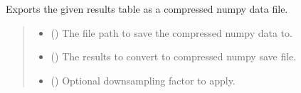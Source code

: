 \documentclass[letterpaper,10pt,english]{sphinxmanual}
\begin{document}
\begin{fulllineitems}
\label{\detokenize{modules/output/formats:qnav.output.formats.save_as_numpy_comp}}
\pysigstartsignatures
{}
\pysigstopsignatures
\sphinxAtStartPar
Exports the given results table as a compressed numpy data file.
\begin{quote}\begin{description}
\begin{itemize}
\item {} 
\sphinxAtStartPar
{} () \textendash{} The file path to save the compressed numpy data to.

\item {} 
\sphinxAtStartPar
{} ({\hyperref[\detokenize{modules/output/data:qnav.output.data.ResultsTable}]{}}) \textendash{} The results to convert to compressed numpy save file.

\item {} 
\sphinxAtStartPar
{} () \textendash{} Optional down\sphinxhyphen{}sampling factor to apply.

\end{itemize}

\end{description}\end{quote}

\end{fulllineitems}

\end{document}
